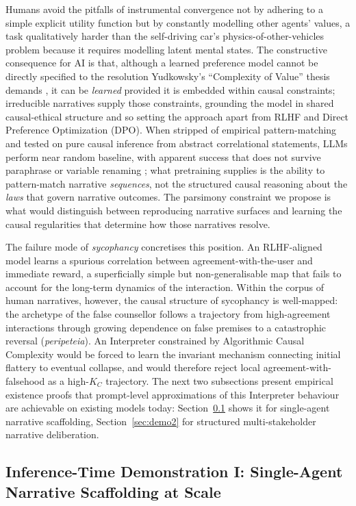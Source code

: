 \documentclass{article}
\theoremstyle{plain}
\theoremstyle{definition}
\theoremstyle{remark}
\begin{document}
Humans avoid the pitfalls of instrumental convergence not by adhering to a simple explicit utility function but by constantly modelling other agents' values, a task qualitatively harder than the self-driving car's physics-of-other-vehicles problem because it requires modelling latent mental states. The constructive consequence for AI is that, although a learned preference model cannot be directly specified to the resolution Yudkowsky's ``Complexity of Value'' thesis demands \citep{yudkowsky11}, it can be \emph{learned} provided it is embedded within causal constraints; irreducible narratives supply those constraints, grounding the model in shared causal-ethical structure and so setting the approach apart from RLHF and Direct Preference Optimization (DPO). When stripped of empirical pattern-matching and tested on pure causal inference from abstract correlational statements, LLMs perform near random baseline, with apparent success that does not survive paraphrase or variable renaming \citep{jin23}; what pretraining supplies is the ability to pattern-match narrative \emph{sequences}, not the structured causal reasoning about the \emph{laws} that govern narrative outcomes. The parsimony constraint we propose is what would distinguish between reproducing narrative surfaces and learning the causal regularities that determine how those narratives resolve.

The failure mode of \emph{sycophancy} concretises this position. An RLHF-aligned model learns a spurious correlation between agreement-with-the-user and immediate reward, a superficially simple but non-generalisable map that fails to account for the long-term dynamics of the interaction. Within the corpus of human narratives, however, the causal structure of sycophancy is well-mapped: the archetype of the false counsellor follows a trajectory from high-agreement interactions through growing dependence on false premises to a catastrophic reversal (\emph{peripeteia}). An Interpreter constrained by Algorithmic Causal Complexity would be forced to learn the invariant mechanism connecting initial flattery to eventual collapse, and would therefore reject local agreement-with-falsehood as a high-$K_C$ trajectory. The next two subsections present empirical existence proofs that prompt-level approximations of this Interpreter behaviour are achievable on existing models today: Section~\ref{sec:demo} shows it for single-agent narrative scaffolding, Section~\ref{sec:demo2} for structured multi-stakeholder narrative deliberation.

\subsection{Inference-Time Demonstration I: Single-Agent Narrative Scaffolding at Scale}
\label{sec:demo}
\end{document}
